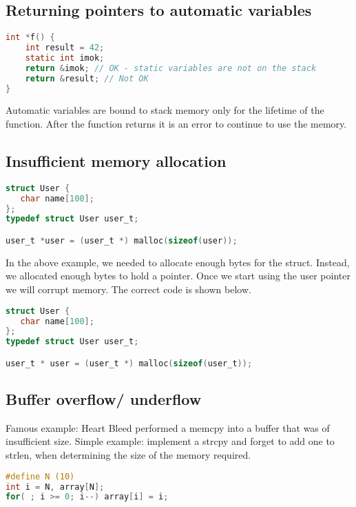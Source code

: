\subsection{Returning pointers to automatic variables}

\begin{lstlisting}[language=C]
int *f() {
    int result = 42;
    static int imok;
    return &imok; // OK - static variables are not on the stack
    return &result; // Not OK
}
\end{lstlisting}

Automatic variables are bound to stack memory only for the lifetime of
the function. After the function returns it is an error to continue to
use the memory.

\subsection{Insufficient memory allocation}

\begin{lstlisting}[language=C]
struct User {
   char name[100];
};
typedef struct User user_t;

user_t *user = (user_t *) malloc(sizeof(user));
\end{lstlisting}

In the above example, we needed to allocate enough bytes for the struct.
Instead, we allocated enough bytes to hold a pointer.
Once we start using the user pointer we will corrupt memory.
The correct code is shown below.

\begin{lstlisting}[language=C]
struct User {
   char name[100];
};
typedef struct User user_t;

user_t * user = (user_t *) malloc(sizeof(user_t));
\end{lstlisting}

\subsection{Buffer overflow/ underflow}

Famous example: Heart Bleed performed a memcpy into a buffer that was of insufficient size.
Simple example: implement a strcpy and forget to add one to strlen, when determining the size of the memory required.

\begin{lstlisting}[language=C]
#define N (10)
int i = N, array[N];
for( ; i >= 0; i--) array[i] = i;
\end{lstlisting}


